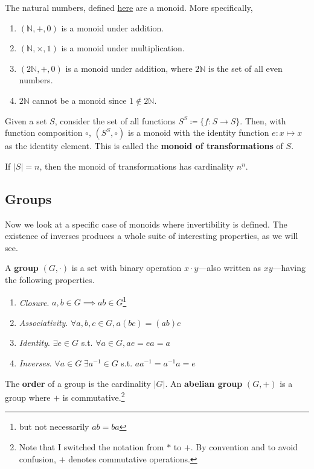   \begin{example}
    The natural numbers, defined \hyperref[st-naturals]{here} are a monoid. More specifically, 
    \begin{enumerate}
      \item $(\mathbb{N}, +, 0)$ is a monoid under addition. 
      \item $(\mathbb{N}, \times, 1)$ is a monoid under multiplication. 
      \item $(2\mathbb{N}, +, 0)$ is a monoid under addition, where $2\mathbb{N}$ is the set of all even numbers. 
      \item $2\mathbb{N}$ cannot be a monoid since $1 \not\in 2\mathbb{N}$. 
    \end{enumerate}
  \end{example}

  \begin{definition}
    Given a set $S$, consider the set of all functions $S^S \coloneqq \{f: S \rightarrow S\}$. Then, with function composition $\circ$, $(S^S, \circ)$ is a monoid with the identity function $e: x \mapsto x$ as the identity element. This is called the \textbf{monoid of transformations} of $S$. 
  \end{definition} 

  \begin{theorem}
    If $|S| = n$, then the monoid of transformations has cardinality $n^n$. 
  \end{theorem}

\subsection{Groups} 

  Now we look at a specific case of monoids where invertibility is defined. The existence of inverses produces a whole suite of interesting properties, as we will see. 
  
  \begin{definition}[Group]
    A \textbf{group} $(G, \cdot)$ is a set with binary operation $x \cdot y$---also written as $xy$---having the following properties.
    \begin{enumerate}
      \item \textit{Closure}. $a, b \in G \implies ab \in G$\footnote{but not necessarily $ab = ba$}
      \item \textit{Associativity}. $\forall a, b, c \in G, a(bc) = (ab)c$
      \item \textit{Identity}. $\exists e \in G$ s.t. $\forall a \in G, ae = ea = a$
      \item \textit{Inverses}. $\forall a \in G \; \exists a^{-1} \in G$ s.t. $a a^{-1} = a^{-1} a = e$
    \end{enumerate}
    The \textbf{order} of a group is the cardinality $|G|$. An \textbf{abelian group} $(G, +)$ is a group where $+$ is commutative.\footnote{Note that I switched the notation from $\ast$ to $+$. By convention and to avoid confusion, $+$ denotes commutative operations. }
  \end{definition} 


